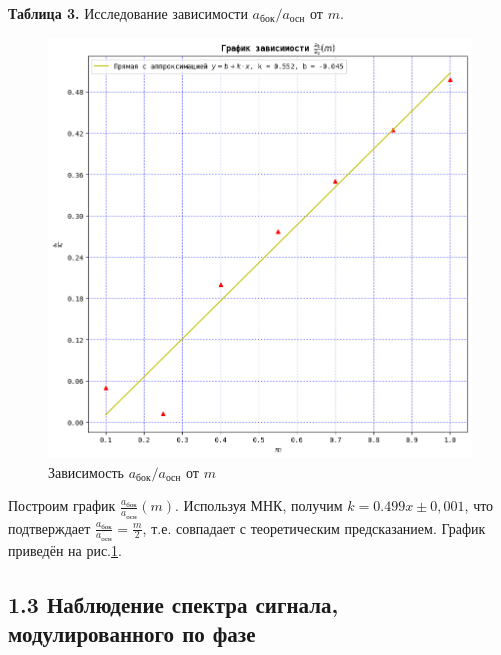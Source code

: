 \documentclass[a4paper,12pt]{article}
\theoremstyle{definition}
\begin{document}
\begin{enumerate}
\begin{center}
\textbf{Таблица 3.} Исследование зависимости $a_{\text{бок}}/a_{\text{осн}}$ от $m$.
\end{center}
\begin{figure}[h]
    \centering
    \includegraphics[width=0.7\linewidth]{grafic3.png}
    \caption{Зависимость $a_{\text{бок}}/a_{\text{осн}}$ от $m$}
    \label{grafic3}
\end{figure}
Построим график $\frac{a_{\text{бок}}}{a_{\text{осн}}}(m)$. Используя МНК, получим $k=0.499x\pm0,001$, что подтверждает $\frac{a_{\text{бок}}}{a_{\text{осн}}}=\frac{m}{2}$, т.е. совпадает с теоретическим предсказанием. График приведён на рис.\ref{grafic3}.




\end{enumerate}








\newpage



\subsection*{1.3 Наблюдение спектра сигнала, модулированного по фазе}
\end{document}
